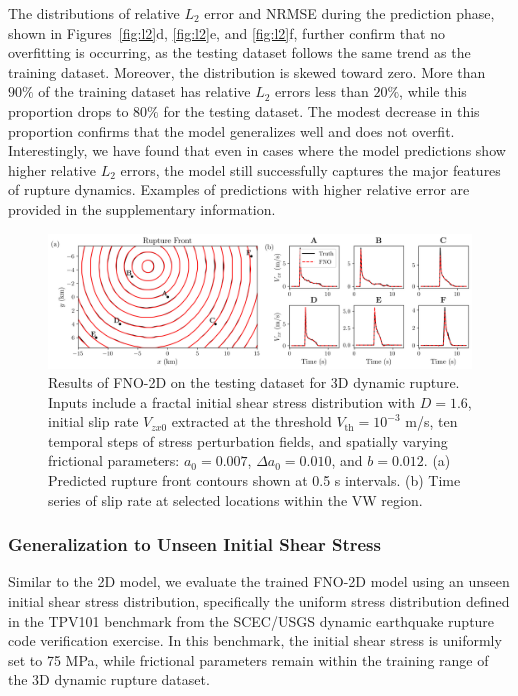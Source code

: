 \documentclass[draft]{agujournal2019}
\begin{document}
The distributions of relative \(L_2\) error and NRMSE during the prediction phase, shown in Figures~\ref{fig:l2}d, \ref{fig:l2}e, and \ref{fig:l2}f, further confirm that no overfitting is occurring, as the testing dataset follows the same trend as the training dataset. Moreover, the distribution is skewed toward zero. More than \(90\%\) of the training dataset has relative \(L_2\) errors less than \(20\%\), while this proportion drops to \(80\%\) for the testing dataset. The modest decrease in this proportion confirms that the model generalizes well and does not overfit. Interestingly, we have found that even in cases where the model predictions show higher relative \(L_2\) errors, the model still successfully captures the major features of rupture dynamics. Examples of predictions with higher relative error are provided in the supplementary information.

\begin{figure}
\centering
\includegraphics[width=1.0\linewidth]{3D_fractal_test.png}
\caption{\label{fig:3D_test}Results of FNO-2D on the testing dataset for 3D dynamic rupture. Inputs include a fractal initial shear stress distribution with \( D = 1.6 \), initial slip rate \( V_{zx0} \) extracted at the threshold \( V_\text{th} = 10^{-3} \) m/s, ten temporal steps of stress perturbation fields, and spatially varying frictional parameters: \( a_0 = 0.007 \), \( \Delta a_0 = 0.010 \), and \( b = 0.012 \). (a) Predicted rupture front contours shown at 0.5 s intervals. (b) Time series of slip rate at selected locations within the VW region.
}
\end{figure}

 \subsubsection{Generalization to Unseen Initial Shear Stress}
\label{sec:FNO-2D_unseen_shear}

Similar to the 2D model, we evaluate the trained FNO-2D model using an unseen initial shear stress distribution, specifically the uniform stress distribution defined in the TPV101 benchmark from the SCEC/USGS dynamic earthquake rupture code verification exercise. In this benchmark, the initial shear stress is uniformly set to 75 MPa, while frictional parameters remain within the training range of the 3D dynamic rupture dataset. 
\end{document}
